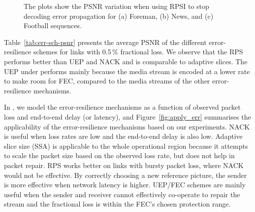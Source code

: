 \begin{figure}[!t]
\caption{The plots show the PSNR variation when using RPSI to stop decoding
error propagation for (a) Foreman, (b) News, and (c) Football sequences.}
\label{fig:rpsi_sim}
\end{figure}

Table~\ref{tab:err-sch-psnr} presents the average PSNR of the different 
error-resilience schemes for links with 0.5\,\% fractional loss. We observe that the
RPS performs better than UEP and NACK and is comparable to adaptive slices.
The UEP under performs mainly because the media stream is encoded at a lower
rate to make room for FEC, compared to the media streams of the other
error-resilience mechanisms.

\begin{table}
\caption{Comparing the performance of different error-resilience
schemes on three different types of YUV sequences~\cite{YUV_seq}. The link
loss rate is 0.5\,\% at each 3G link.}
\label{tab:err-sch-psnr}
\end{table}

In , we model the error-resilience mechanisms as a function of
observed packet loss and end-to-end delay (or latency), and
Figure~\ref{fig:apply_err} summarises the applicability of the
error-resilience mechanisms based on our experiments. NACK is useful when loss
rates are low and the end-to-end delay is also low. Adaptive slice size (SSA)
is applicable to the whole operational region because it attempts to scale the
packet size based on the observed loss rate, but does not help in packet
repair. RPS works better on links with bursty packet loss, where NACK would
not be effective. By correctly choosing a new reference picture, the sender is
more effective when network latency is higher. UEP/FEC schemes are mainly useful when
the sender and receiver cannot effectively co-operate to repair the stream and
the fractional loss is within the FEC's chosen protection range.

